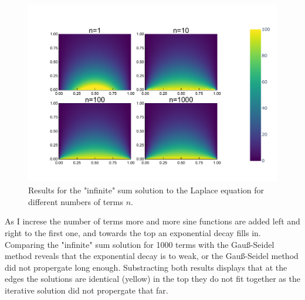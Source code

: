 \documentclass[
	a4paper, %
	10pt, %
]{CSUniSchoolLabReport}
\begin{document}
\begin{figure}[H]
	\centering
	\includegraphics[width=\textwidth]{../saves_t1/comp_lapplace_series_heatmap.pdf}
	\caption{Results for the "infinite" sum solution to the Laplace equation for different numbers of terms $n$.}
\end{figure}

As I increse the number of terms more and more sine functions are added left and right to the first one, and towards the top an exponential decay fills in. Comparing the "infinite" sum solution for 1000 terms with the Gauß-Seidel method reveals that the exponential decay is to weak, or the Gauß-Seidel method did not propergate long enough. Substracting both results displays that at the edges the solutions are identical (yellow) in the top they do not fit together as the iterative solution did not propergate that far.
\end{document}
